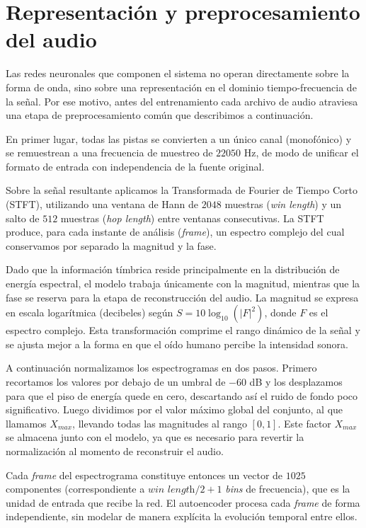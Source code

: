 \documentclass[12pt,a4paper,twoside]{tesis}
\begin{document}
\newpage
\section{Representación y preprocesamiento del audio}

Las redes neuronales que componen el sistema no operan directamente sobre la forma de onda, sino sobre una representación en el dominio tiempo-frecuencia de la señal. Por ese motivo, antes del entrenamiento cada archivo de audio atraviesa una etapa de preprocesamiento común que describimos a continuación.

En primer lugar, todas las pistas se convierten a un único canal (monofónico) y se remuestrean a una frecuencia de muestreo de $22050$ Hz, de modo de unificar el formato de entrada con independencia de la fuente original.

Sobre la señal resultante aplicamos la Transformada de Fourier de Tiempo Corto (STFT), utilizando una ventana de Hann de $2048$ muestras (\textit{win length}) y un salto de $512$ muestras (\textit{hop length}) entre ventanas consecutivas. La STFT produce, para cada instante de análisis (\textit{frame}), un espectro complejo del cual conservamos por separado la magnitud y la fase.

Dado que la información tímbrica reside principalmente en la distribución de energía espectral, el modelo trabaja únicamente con la magnitud, mientras que la fase se reserva para la etapa de reconstrucción del audio. La magnitud se expresa en escala logarítmica (decibeles) según $S = 10\log_{10}(|F|^2)$, donde $F$ es el espectro complejo. Esta transformación comprime el rango dinámico de la señal y se ajusta mejor a la forma en que el oído humano percibe la intensidad sonora.

A continuación normalizamos los espectrogramas en dos pasos. Primero recortamos los valores por debajo de un umbral de $-60$ dB y los desplazamos para que el piso de energía quede en cero, descartando así el ruido de fondo poco significativo. Luego dividimos por el valor máximo global del conjunto, al que llamamos $X_{max}$, llevando todas las magnitudes al rango $[0, 1]$. Este factor $X_{max}$ se almacena junto con el modelo, ya que es necesario para revertir la normalización al momento de reconstruir el audio.

Cada \textit{frame} del espectrograma constituye entonces un vector de $1025$ componentes (correspondiente a $\textit{win length}/2 + 1$ \textit{bins} de frecuencia), que es la unidad de entrada que recibe la red. El autoencoder procesa cada \textit{frame} de forma independiente, sin modelar de manera explícita la evolución temporal entre ellos.
\end{document}
